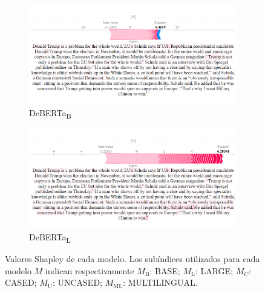 \begin{figure}[!h]
    \begin{subfigure}[t]{0.35\textwidth}
        \includegraphics[width=\textwidth]{figs/news_T/deberta-b.png}
        \caption{{DeBERTa}\textsubscript{B}}
    \end{subfigure}
    \hspace{\fill} %
    \begin{subfigure}[t]{0.35\textwidth}
        \includegraphics[width=\linewidth]{figs/news_T/deberta-l.png}
        \caption{{DeBERTa}\textsubscript{L}}
    \end{subfigure}    
    
    \caption{Valores Shapley de cada modelo. Los subíndices utilizados para cada modelo $M$ indican respectivamente $M_{\text{B}}$: BASE; $M_{\text{L}}$: LARGE; $M_{C}$: CASED; $M_{\text{U}}$: UNCASED; $M_{\text{ML}}$: MULTILINGUAL.}
\end{figure}

  